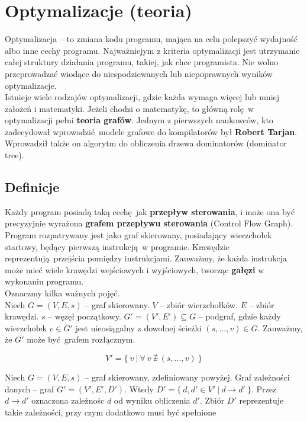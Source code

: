 \section{Optymalizacje (teoria)}
	
	Optymalizacja -- to zmiana kodu programu, mająca na celu polepszyć wydajność albo inne cechy
	programu. Najważniejym z kriteria optymalizacji jest utrzymanie całej struktury działania programu,
	takiej, jak chce programista. Nie wolno przeprowadzać wiodące do niespodziewanych lub
	niepoprawnych wyników optymalizacje.
	\\
	
	Istnieje wiele rodzajów optymalizacji, gdzie każda wymaga więcej lub mniej założeń i
	matematyki. Jeżeli chodzi o matematykę, to główną rolę w optymalizacji pełni \textbf{teoria grafów}.
	Jednym z pierwszych naukowców, kto zadecydował wprowadzić modele grafowe do kompilatorów był
	\textbf{Robert Tarjan}. Wprowadził także on algorytm do obliczenia drzewa dominatorów (dominator tree).

	\subsection{Definicje}
		Każdy program posiadą taką cechę jak \textbf{przepływ sterowania}, i może ona być
		precyzyjnie wyrażona \textbf{grafem przepływu sterowania} (Control Flow Graph). Program
		rozpatrywany jest jako graf skierowany, posiadający wierzchołek startowy, będący pierwszą
		instrukcją w programie. Krawędzie reprezentują przejścia pomiędzy instrukcjami. Zauważmy,
		że każda instrukcja może mieć wiele krawędzi wejściowych i wyjściowych, tworząc \textbf{gałęzi}
		w wykonaniu programu.
		\\
		
		Oznaczmy kilka ważnych pojęć.
		\\

		Niech $G = (V, E, s)$ -- graf skierowany.
		$V$ -- zbiór wierzchołków. $E$ -- zbiór krawędzi. $s$ -- węzęł początkowy.
		$G' = (V', E') \subseteq G$ -- podgraf, gdzie każdy wierzchołek $v \in G'$ jest nieosiągalny z
		dowolnej ścieżki $(s, ...,  v) \in G$. Zauważmy, że $G'$ może być grafem rozłącznym.

		$$V' = \{ \ v \ | \ \forall \ v \ \nexists \ (s, ..., v) \ \}$$

		\spacing

		Niech $G = (V, E, s)$ -- graf skierowany, zdefiniowany powyżej. Graf zależności danych -- graf
		$G' = (V', E', D')$. Wtedy $D' = \{ \ d, d' \in V' \ | \ d \rightarrow d' \ \}$. Przez $d \rightarrow d'$
		oznaczona zależnośc $d$ od wyniku obliczenia $d'$. Zbiór $D'$ reprezentuje takie zależności, przy czym
		dodatkowo musi być spełnione

